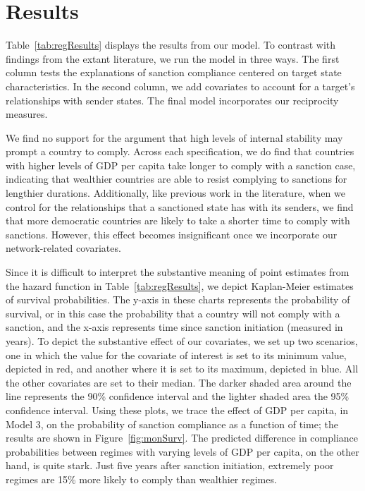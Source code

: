 \section*{Results}
\label{Results} 

Table~\ref{tab:regResults} displays the results from our model. To contrast with findings from the extant literature, we run the model in three ways. The first column tests the explanations of sanction compliance centered on target state characteristics. In the second column, we add covariates to account for a target's relationships with sender states. The final model incorporates our reciprocity measures. 



We find no support for the argument that high levels of internal stability may prompt a country to comply. Across each specification, we do find that countries with higher levels of GDP per capita take longer to comply with a sanction case, indicating that wealthier countries are able to resist complying to sanctions for lengthier durations. Additionally, like previous work in the literature, when we control for the relationships that a sanctioned state has with its senders, we find that more democratic countries are likely to take a shorter time to comply with sanctions. However, this effect becomes insignificant once we incorporate our network-related covariates. 

Since it is difficult to interpret the substantive meaning of point estimates from the hazard function in Table~\ref{tab:regResults}, we depict Kaplan-Meier estimates of survival probabilities. The y-axis in these charts represents the probability of survival, or in this case the probability that a country will not comply with a sanction, and the x-axis represents time since sanction initiation (measured in years). To depict the substantive effect of our covariates, we set up two scenarios, one in which the value for the covariate of interest is set to its minimum value, depicted in red, and another where it is set to its maximum, depicted in blue. All the other covariates are set to their median. The darker shaded area around the line represents the 90\% confidence interval and the lighter shaded area the 95\% confidence interval. Using these plots, we trace the effect of GDP per capita, in Model 3, on the probability of sanction compliance as a function of time; the results are shown in Figure~\ref{fig:monSurv}. The predicted difference in compliance probabilities between regimes with varying levels of GDP per capita, on the other hand, is quite stark. Just five years after sanction initiation, extremely poor regimes are 15\% more likely to comply than wealthier regimes. 

